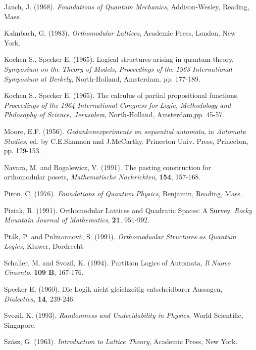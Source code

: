 \begin{thebibliography}{bib}
Jauch, J. (1968). {\em Foundations of Quantum Mechanics},
Addison-Wesley, Reading, Mass.

Kalmbach, G. (1983). {\em Orthomodular Lattices},
Academic Press, London, New York.

Kochen S., Specker E. (1965).
 Logical structures arising in quantum
theory,
{\sl Symposium on the Theory of Models, Proceedings of the 1963
International Symposium at Berkely}, North-Holland, Amsterdam, pp.
177-189.

Kochen S., Specker E. (1965). The calculus of partial propositional
functions,
{\sl Proceedings of the 1964 International Congress for Logic, Methodology
and Philosophy of Science, Jerusalem},
North-Holland, Amsterdam,pp. 45-57.

 Moore, E.F. (1956).
 {\em Gedankenexperiments on sequential
automata}, in {\em Automata Studies}, ed. by C.E.Shannon and J.McCarthy,
Princeton Univ. Press, Princeton, pp.  129-153.

Navara, M. and Rogalewicz, V. (1991). The pasting construction for
orthomodular posets, {\em Mathematische Nachrichten}, {\bf 154},
157-168.

Piron, C. (1976). {\em Foundations of Quantum Physics},
Benjamin, Reading, Mass.

Piziak, R. (1991). Orthomodular Lattices and Quadratic Spaces: A Survey,
{\em Rocky Mountain Journal of Mathematics}, {\bf 21}, 951-992.

Pt\'ak, P. and Pulmannov\'a, S. (1991). {\em Orthomodualar Structures as
Quantum Logics}, Kluwer, Dordrecht.

Schaller, M. and Svozil, K. (1994). Partition Logics of Automata,
{\em Il Nuovo Cimento}, {\bf 109 B},  167-176.

Specker E. (1960). Die Logik nicht gleichzeitig entscheidbarer Aussagen,
{\sl Dialectica}, {\bf 14}, 239-246.



Svozil, K. (1993). {\em Randomness and Undecidability in Physics},
World Scientific, Singapore.

Sz\'asz, G. (1963). {\em Introduction to Lattice Theory},
Academic Press, New York.

\end{thebibliography}


